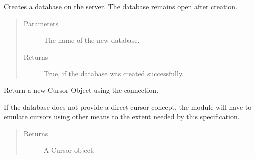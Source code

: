 \documentclass[letterpaper,10pt,english]{sphinxmanual}
\begin{document}
\begin{fulllineitems}
\begin{fulllineitems}
\begin{quote}
\begin{description}
\end{description}\end{quote}

\end{fulllineitems}


\begin{fulllineitems}
\label{\detokenize{index:secondodb.api.secondoapi.Connection.create_database}}
Creates a database on the  server. The database remains open after creation.
\begin{quote}\begin{description}
\item[{Parameters}] \leavevmode
{} \textendash{} The name of the new database.

\item[{Returns}] \leavevmode
True, if the database was created successfully.

\end{description}\end{quote}

\end{fulllineitems}


\begin{fulllineitems}
\label{\detokenize{index:secondodb.api.secondoapi.Connection.cursor}}
Return a new Cursor Object using the connection.

If the database does not provide a direct cursor concept, the module will have to emulate cursors using other
means to the extent needed by this specification.
\begin{quote}\begin{description}
\item[{Returns}] \leavevmode
A Cursor object.

\end{description}\end{quote}

\end{fulllineitems}



\end{fulllineitems}
\end{document}
